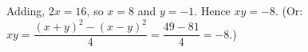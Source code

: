 Adding, $2x=16$, so $x=8$ and $y=-1$. Hence $xy=\boxed{-8}$. (Or: $xy=\dfrac{(x+y)^2-(x-y)^2}{4}=\dfrac{49-81}{4}=-8$.)
